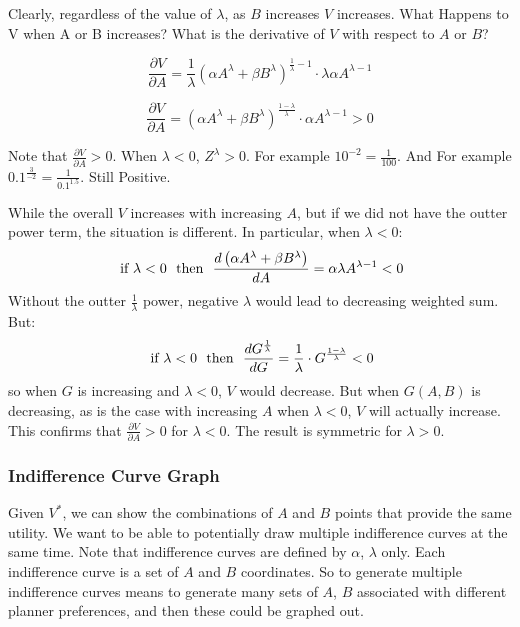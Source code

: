 \documentclass[
]{book}
\begin{document}
Clearly, regardless of the value of \(\lambda\), as \(B\) increases \(V\) increases. What Happens to V when A or B increases? What is the derivative of \(V\) with respect to \(A\) or \(B\)?

\[
    \frac{\partial V}{\partial A}
    =
    \frac{1}{\lambda}
    \left(
    \alpha
    A^{\lambda}
    +
    \beta
    B^{\lambda}
    \right)^{\frac{1}{\lambda}-1}
    \cdot
    \lambda
    \alpha
    A^{\lambda -1}
\]

\[
    \frac{\partial V}{\partial A}
    =
    \left(
    \alpha
    A^{\lambda}
    +
    \beta
    B^{\lambda}
    \right)^{\frac{1-\lambda}{\lambda}}
    \cdot
    \alpha
    A^{\lambda -1}
    >0
\]

Note that \(\frac{\partial V}{\partial A}>0\). When \(\lambda <0\), \(Z^{\lambda}>0\). For example \(10^{-2}=\frac{1}{100}\). And For example \(0.1^{\frac{3}{-2}}=\frac{1}{0.1^{1.5}}\). Still Positive.

While the overall \(V\) increases with increasing \(A\), but if we did not have the outter power term, the situation is different. In particular, when \(\lambda < 0\):
\[
\text{ if } \lambda <0
\thinspace\thinspace
\text{ then }
\thinspace\thinspace
\frac{d \left(\alpha A^{\lambda} + \beta B^{\lambda}\right)}{dA}=\alpha\lambda A^{\lambda -1}<0
\]
Without the outter \(\frac{1}{\lambda}\) power, negative \(\lambda\) would lead to decreasing weighted sum. But:
\[
\text{ if } \lambda <0
\thinspace\thinspace
\text{ then }
\thinspace\thinspace
\frac{dG^{\frac{1}{\lambda}}}{dG}=\frac{1}{\lambda}\cdot G^{\frac{1-\lambda}{\lambda}}<0
\]
so when \(G\) is increasing and \(\lambda <0\), \(V\) would decrease. But when \(G\left(A,B\right)\) is decreasing, as is the case with increasing \(A\) when \(\lambda <0\), \(V\) will actually increase. This confirms that \(\frac{\partial V}{\partial A}>0\) for \(\lambda <0\). The result is symmetric for \(\lambda >0\).

\hypertarget{indifference-curve-graph}{%
\subsubsection{Indifference Curve Graph}\label{indifference-curve-graph}}

Given \(V^{\ast}\), we can show the combinations of \(A\) and \(B\) points that provide the same utility. We want to be able to potentially draw multiple indifference curves at the same time. Note that indifference curves are defined by \(\alpha\), \(\lambda\) only. Each indifference curve is a set of \(A\) and \(B\) coordinates. So to generate multiple indifference curves means to generate many sets of \(A\), \(B\) associated with different planner preferences, and then these could be graphed out.
\end{document}
